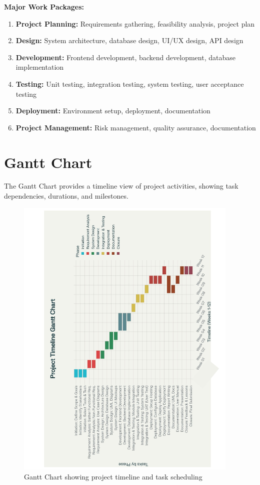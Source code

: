 \textbf{Major Work Packages:}
\begin{enumerate}[leftmargin=*]
    \item \textbf{Project Planning:} Requirements gathering, feasibility analysis, project plan
    \item \textbf{Design:} System architecture, database design, UI/UX design, API design
    \item \textbf{Development:} Frontend development, backend development, database implementation
    \item \textbf{Testing:} Unit testing, integration testing, system testing, user acceptance testing
    \item \textbf{Deployment:} Environment setup, deployment, documentation
    \item \textbf{Project Management:} Risk management, quality assurance, documentation
\end{enumerate}

\section{Gantt Chart}

The Gantt Chart provides a timeline view of project activities, showing task dependencies, durations, and milestones.

\begin{figure}[h]
    \centering
    \includegraphics[width=0.95\textwidth]{images/Gantt Chart.jpg}
    \caption{Gantt Chart showing project timeline and task scheduling}
    \label{fig:gantt}
\end{figure}


